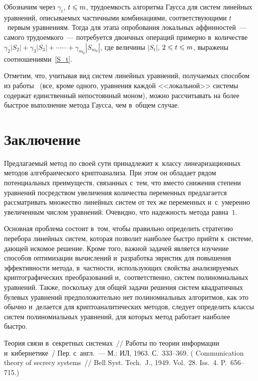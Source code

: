 \begin{multicols}{2}
Обозначим через $\gamma_t$, $t\hm\leqslant m$, трудоемкость алгоритма Гаусса для систем 
линейных уравнений, описываемых частичными комбинациями, соответствующими 
$t$~первым уравнениям.
Тогда для этапа опробования локальных аффинностей~--- самого трудоемкого~--- 
потребуется двоичных операций примерно в~количестве
$\gamma_2\left\vert S_2\right\vert + \gamma_{3}
\left\vert S_{3}\right\vert + \cdots$\linebreak$\cdots + \gamma_{m_0}\left\vert S_{m_0}\right\vert$,
где величины $|S_t|$, $2\hm\leqslant t\hm\leqslant m$, выражены соотношениями~\eqref{S_t}.

Отметим, что, учитывая вид систем линейных уравнений, получаемых способом из 
работы~\cite{LSF2019} (все, кроме одного, уравнения каждой <<локальной>> системы 
содержат единственный непостоянный моном), можно рассчитывать на более быстрое 
выполнение метода Гаусса, чем в~общем случае.

\section*{Заключение}

Предлагаемый метод по своей сути принадлежит к~классу линеаризационных методов 
алгебраического криптоанализа.
При этом он обладает рядом потенциальных преимуществ, связанных с~тем, что 
вместо снижения степени уравнений посредством увеличения количества переменных 
предлагается рассматривать множество линейных систем от тех же переменных 
и~с~умеренно увеличенным числом уравнений.
Очевидно, что надежность метода равна~$1$.

Основная проблема состоит в~том, чтобы правильно определить стратегию перебора 
линейных систем, которая позволит наиболее быстро \mbox{прийти} к~системе, дающей 
искомое решение.
Кроме того, важной задачей является изучение способов оптимизации вычислений 
и~разработка эвристик для повышения эффективности метода, в~част\-ности, 
использующих свойства анализируемых криптографических преобразований 
и,~соответственно, сис\-тем полиномиальных уравнений.
Также, поскольку для общей задачи решения систем квадратичных булевых уравнений 
предположительно нет полиномиальных алгоритмов, как это обычно и~делается для 
криптоаналитических методов, следует определить классы систем полиномиальных 
уравнений, для которых метод работает наиболее быстро.

{\small\frenchspacing
 {%
 \begin{thebibliography}{99}
        Теория связи в~секретных системах~// Работы по теории информации 
        и~кибернетике~/ Пер. с~англ.~--- М.: ИЛ, 1963. С.~333--369.
        ( Communication theory of secrecy systems~// Bell 
Syst. Tech.~J., 1949. Vol.~28. Iss.~4. P.~656--715.)


\end{thebibliography}}}
\end{multicols}

